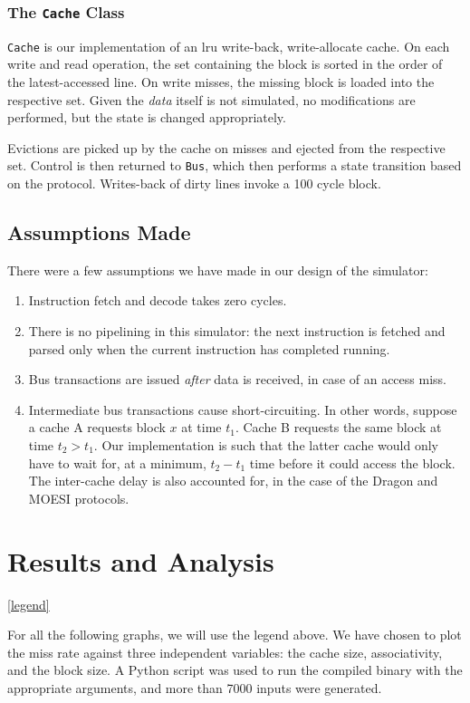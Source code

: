 \documentclass[date,tikzlibs,lmodern,10pt]{epreport}
\begin{document}
\subsubsection{The \texttt{Cache} Class}
\texttt{Cache} is our implementation of an \gls{lru} write-back, write-allocate cache.
On each write and read operation, the set containing the block is sorted in the order of the latest-accessed line.
On write misses, the missing block is loaded into the respective set.
Given the \emph{data} itself is not simulated, no modifications are performed, but the state is changed appropriately.

Evictions are picked up by the cache on misses and ejected from the respective set.
Control is then returned to \texttt{Bus}, which then performs a state transition based on the protocol. Writes-back of dirty lines invoke a 100 cycle block.

\subsection{Assumptions Made}
There were a few assumptions we have made in our design of the simulator:
\begin{enumerate}
	\item Instruction fetch and decode takes zero cycles.
	\item There is no pipelining in this simulator: the next instruction is fetched and parsed only when the current instruction has completed running.
	\item Bus transactions are issued \emph{after} data is received, in case of an access miss.
	\item Intermediate bus transactions cause short-circuiting.
	      In other words, suppose a cache A requests block \(x\) at time \(t_1\).
	      Cache B requests the same block at time \(t_2 > t_1\). Our implementation is such that the latter cache would only have to wait for, at a minimum, \(t_2 - t_1\) time before it could access the block.
	      The inter-cache delay is also accounted for, in the case of the Dragon and MOESI protocols.
\end{enumerate}

\section{Results and Analysis}

\ref{legend}

For all the following graphs, we will use the legend above.
We have chosen to plot the miss rate against three independent variables: the cache size, associativity, and the block size.
A Python script was used to run the compiled binary with the appropriate arguments, and more than 7000 inputs were generated.
\end{document}

